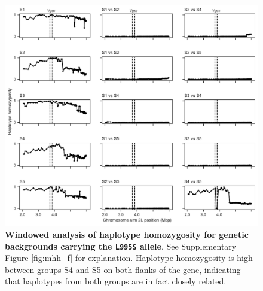 \documentclass[a4paper,11pt,abstracton,hidelinks]{scrartcl}
\begin{document}
%
\begin{figure}[!b]
  \includegraphics[width=1.1\linewidth,center]{artwork/mhh_S.pdf}
  \caption{\textbf{Windowed analysis of haplotype homozygosity for genetic backgrounds carrying the \texttt{L995S} allele}. See Supplementary Figure \ref{fig:mhh_f} for explanation. Haplotype homozygosity is high between groups S4 and S5 on both flanks of the gene, indicating that haplotypes from both groups are in fact closely related.}
  \label{fig:mhh_s}
\end{figure}


\clearpage
\end{document}
